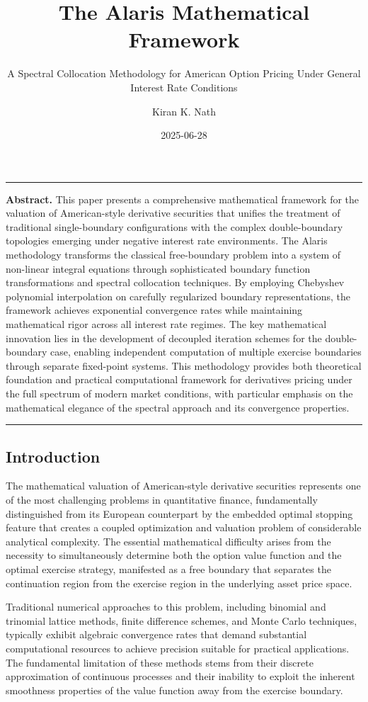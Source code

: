 \documentclass[
  11pt,
  11pt,
  letterpaper,
  onecolumn]{article}
\title{The Alaris Mathematical Framework}
\subtitle{A Spectral Collocation Methodology for American Option Pricing
Under General Interest Rate Conditions}
\author{Kiran K. Nath}
\date{2025-06-28}
\renewenvironment{abstract}
  {\small\quotation\noindent\rule{\linewidth}{.5pt}\par\smallskip
   \noindent\textbf{Abstract.}\space}
  {\par\smallskip\noindent\rule{\linewidth}{.5pt}\endquotation}
\begin{document}
\maketitle
\begin{abstract}
This paper presents a comprehensive mathematical framework for the
valuation of American-style derivative securities that unifies the
treatment of traditional single-boundary configurations with the complex
double-boundary topologies emerging under negative interest rate
environments. The Alaris methodology transforms the classical
free-boundary problem into a system of non-linear integral equations
through sophisticated boundary function transformations and spectral
collocation techniques. By employing Chebyshev polynomial interpolation
on carefully regularized boundary representations, the framework
achieves exponential convergence rates while maintaining mathematical
rigor across all interest rate regimes. The key mathematical innovation
lies in the development of decoupled iteration schemes for the
double-boundary case, enabling independent computation of multiple
exercise boundaries through separate fixed-point systems. This
methodology provides both theoretical foundation and practical
computational framework for derivatives pricing under the full spectrum
of modern market conditions, with particular emphasis on the
mathematical elegance of the spectral approach and its convergence
properties.
\end{abstract}


\subsection{Introduction}\label{introduction}

The mathematical valuation of American-style derivative securities
represents one of the most challenging problems in quantitative finance,
fundamentally distinguished from its European counterpart by the
embedded optimal stopping feature that creates a coupled optimization
and valuation problem of considerable analytical complexity. The
essential mathematical difficulty arises from the necessity to
simultaneously determine both the option value function and the optimal
exercise strategy, manifested as a free boundary that separates the
continuation region from the exercise region in the underlying asset
price space.

Traditional numerical approaches to this problem, including binomial and
trinomial lattice methods, finite difference schemes, and Monte Carlo
techniques, typically exhibit algebraic convergence rates that demand
substantial computational resources to achieve precision suitable for
practical applications. The fundamental limitation of these methods
stems from their discrete approximation of continuous processes and
their inability to exploit the inherent smoothness properties of the
value function away from the exercise boundary.
\end{document}
